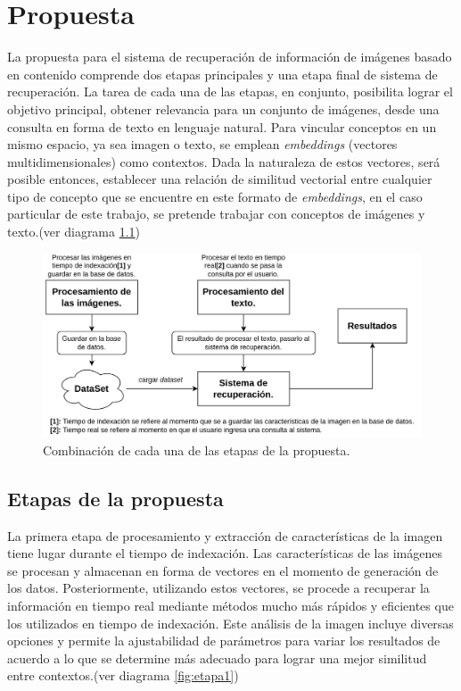 \chapter{Propuesta}\label{chapter:proposal}
La propuesta para el sistema de recuperación de información de imágenes basado en contenido comprende dos etapas principales y una etapa final de sistema de recuperaci\'on. La tarea de cada una de las etapas, en conjunto, posibilita lograr el objetivo principal, obtener relevancia para un conjunto de im\'agenes, desde una consulta en forma de texto en lenguaje natural. Para vincular conceptos en un mismo espacio, ya sea imagen o texto, se emplean \textit{embeddings} (vectores multidimensionales) como contextos. Dada la naturaleza de estos vectores, ser\'a posible entonces, establecer una relaci\'on de similitud vectorial entre cualquier tipo de concepto que se encuentre en este formato de \textit{embeddings}, en el caso particular de este trabajo, se pretende trabajar con conceptos de im\'agenes y texto.(ver diagrama \ref{fig:etapas})

\begin{figure}[H]
    \centering
\includegraphics[height=0.25\textheight]{Graphics/Todas.drawio.png}
    \caption{Combinaci\'on de cada una de las etapas de la propuesta.}
    \label{fig:etapas}
\end{figure}    

\section{Etapas de la propuesta}

La primera etapa de procesamiento y extracción de características de la imagen tiene lugar durante el tiempo de indexación. Las características de las imágenes se procesan y almacenan en forma de vectores en el momento de generación de los datos. Posteriormente, utilizando estos vectores, se procede a recuperar la información en tiempo real mediante métodos mucho más rápidos y eficientes que los utilizados en tiempo de indexación. Este análisis de la imagen incluye diversas opciones y permite la ajustabilidad de parámetros para variar los resultados de acuerdo a lo que se determine más adecuado para lograr una mejor similitud entre contextos.(ver diagrama \ref{fig:etapa1})

